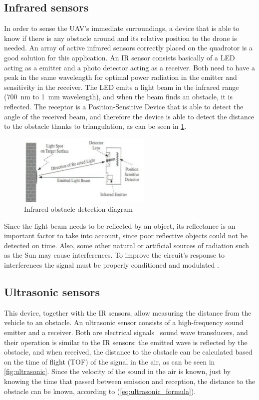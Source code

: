 \documentclass[journal]{IEEEtran}
\begin{document}
		\subsection{Infrared sensors}
		In order to sense the UAV's immediate surroundings, a device that is able to know if there is any obstacle around and its relative position to the drone is needed. An array of active infrared sensors correctly placed on the quadrotor is a good solution for this application. An IR sensor consists basically of a LED acting as a emitter and a photo detector acting as a receiver. Both need to have a peak in the same wavelength for optimal power radiation in the emitter and sensitivity in the receiver. The LED emits a light beam in the infrared range (\SI{700}{\nano \meter} to \SI{1}{\milli \meter} wavelength), and when the beam finds an obstacle, it is reflected. The receptor is a Position-Sensitive Device that is able to detect the angle of the received beam, and therefore the device is able to detect the distance to the obstacle thanks to triangulation, as can be seen in \figurename\ref{fig:ir}.
		\begin{figure}[H]
			\centering
			\includegraphics[width=2.5in]{ir}
			\caption{Infrared obstacle detection diagram}
			\label{fig:ir}
		\end{figure}
		Since the light beam needs to be reflected by an object, its reflectance is an important factor to take into account, since poor reflective objects could not be detected on time.  Also, some other natural or artificial sources of radiation such as the Sun may cause interferences. To improve the circuit's response to interferences the signal must be properly conditioned and modulated \cite{mod_control_bresciani, remotecontrol}.
		
		\subsection{Ultrasonic sensors}
		This device, together with the IR sensors, allow measuring the distance from the vehicle to an obstacle. An ultrasonic sensor consists of a high-frequency sound emitter and a receiver. Both are electrical signals \textendash \ sound wave transducers, and their operation is similar to the IR sensors: the emitted wave is reflected by the obstacle, and when received, the distance to the obstacle can be calculated based on the time of flight (TOF) of the signal in the air, as can be seen in \figurename \ref{fig:ultrasonic}. Since the velocity of the sound in the air is known, just by knowing the time that passed between emission and reception, the distance to the obstacle can be known, according to (\ref{eq:ultrasonic_formula}). 
		
\end{document}
